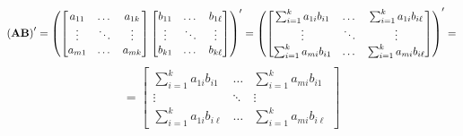 \begin{enumerate}[label=(\alph*)]
            \[
                {\left(\bold{AB}\right)}^\prime =
                {\left(
                \begin{bmatrix}
                    a_{11} & \dots & a_{1k} \\
                    \vdots & \ddots & \vdots \\
                    a_{m1} & \dots & a_{mk}
                \end{bmatrix}
                \begin{bmatrix}
                    b_{11} & \dots & b_{1\ell} \\
                    \vdots & \ddots & \vdots \\
                    b_{k1} & \dots & b_{k\ell}
                \end{bmatrix}
                \right)}^\prime = 
                {\left(
                \begin{bmatrix}
                    \sum_{i=1}^k{a_{1i}b_{i1}} & \dots & \sum_{i=1}^k{a_{1i}b_{i\ell}} \\
                    \vdots & \ddots & \vdots \\
                    \sum_{i=1}^k{a_{mi}b_{i1}} & \dots & \sum_{i=1}^k{a_{mi}b_{i\ell}}
                \end{bmatrix}
                \right)}^\prime = 
            \]
            \[
                = \begin{bmatrix}
                    \sum_{i=1}^k{a_{1i}b_{i1}} & \dots & \sum_{i=1}^k{a_{mi}b_{i1}} \\
                    \vdots & \ddots & \vdots \\
                    \sum_{i=1}^k{a_{1i}b_{i\ell}} & \dots & \sum_{i=1}^k{a_{mi}b_{i\ell}}
                \end{bmatrix}
            \]


\end{enumerate}
